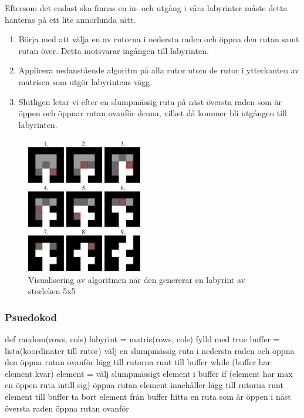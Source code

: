 Eftersom det endast ska finnas en in- och utgång i våra labyrinter måste detta hanteras på ett lite annorlunda sätt.

\begin{enumerate}
	\item Börja med att välja en av rutorna i nedersta raden och öppna den rutan samt rutan över. Detta motsvarar ingången till labyrinten.
	\item Applicera nedanstående algoritm på alla rutor utom de rutor i ytterkanten av matrisen som utgör labyrintens vägg.
	\item Slutligen letar vi efter en slumpmässig ruta på näst översta raden som är öppen och öppnar rutan ovanför denna, vilket då kommer bli utgången till labyrinten.
\end{enumerate}

\begin{figure}[h]
	\begin{center}
		\includegraphics[width=0.45\textwidth]{../img/w09-lab/AlgorithmVisualized.png}
	\end{center}
	\caption{Visualisering av algoritmen när den genererar en labyrint av storleken 5x5}
\end{figure}


\subsubsection{Psuedokod}
\begin{Code}
def random(rows, cols)
	labyrint = matris(rows, cols) fylld med true
	buffer = lista(koordinater till rutor)
	välj en slumpmässig ruta i nedersta raden och öppna den
	öppna rutan ovanför
	lägg till rutorna runt till buffer
	while (buffer har element kvar)
		element = välj slumpmässigt element i buffer
		if (element har max en öppen ruta intill sig)
			öppna rutan element innehåller
			lägg till rutorna runt element till buffer
		ta bort element från buffer
	hitta en ruta som är öppen i näst översta raden
	öppna rutan ovanför
\end{Code}

